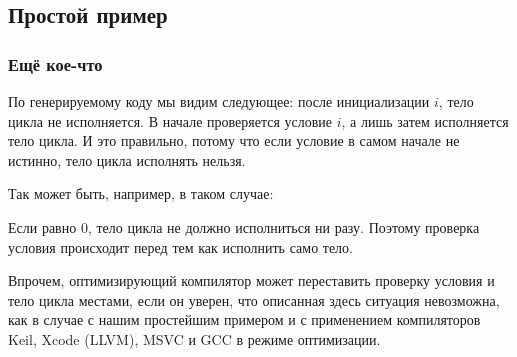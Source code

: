 \subsection{Простой пример}





\subsubsection{Ещё кое-что}

По генерируемому коду мы видим следующее: после инициализации $i$, тело цикла не исполняется.
В начале проверяется условие $i$, а лишь затем исполняется тело цикла.
И это правильно, потому что если условие в самом начале не истинно, тело цикла исполнять нельзя.

Так может быть, например, в таком случае:



Если  равно 0,
тело цикла не должно исполниться ни разу.
Поэтому проверка условия происходит перед тем как исполнить само тело.

Впрочем, оптимизирующий компилятор может переставить проверку условия и тело цикла местами, если он уверен,
что описанная здесь ситуация невозможна, как в случае с нашим простейшим примером и с применением компиляторов
Keil, Xcode (LLVM), MSVC и GCC в режиме оптимизации.

